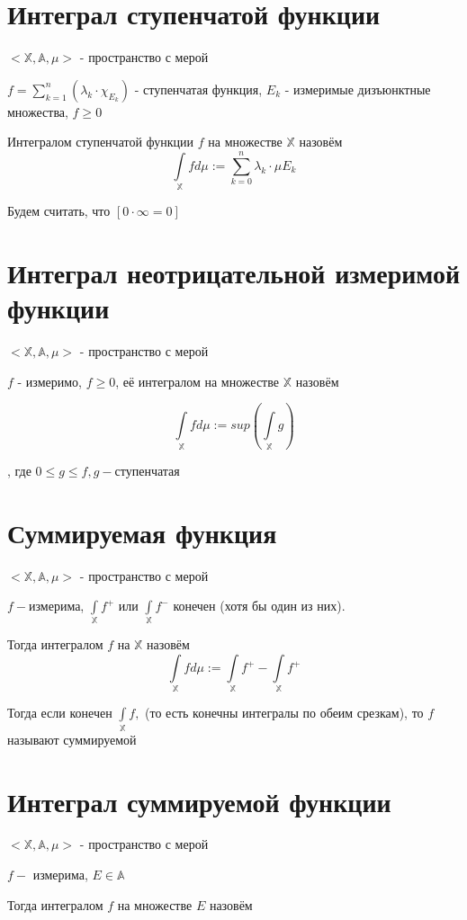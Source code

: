 \documentclass[paper=a4, fontsize=17pt]{article}
\begin{document}
	\section{Интеграл ступенчатой функции}
	$<\mathds{X}, \mathds{A}, \mu>$ - пространство с мерой
	
	$f = \sum\limits_{k = 1}^{n}(\lambda_k \cdot \chi_{E_k})$ - ступенчатая функция, $E_k$ - измеримые дизъюнктные множества, $f \geqslant 0$
	
	Интегралом ступенчатой функции $f$ на множестве $\mathds{X}$ назовём $$\int\limits_\mathds{X} f d\mu := \sum\limits_{k = 0}^{n} \lambda_k \cdot \mu E_k$$
	
	Будем считать, что $[0 \cdot \infty = 0]$
	
	\section{Интеграл неотрицательной измеримой функции}
	$<\mathds{X}, \mathds{A}, \mu>$ - пространство с мерой
	
	$f$ - измеримо, $f \geqslant 0$, её интегралом на множестве $\mathds{X}$ назовём
	
	$$\int\limits_{\mathds{X}} f d\mu := sup (\int\limits_{\mathds{X}} g)$$
	
	, где $0 \leqslant g \leqslant f, g - $ступенчатая
	
	\section{Суммируемая функция}
	$<\mathds{X}, \mathds{A}, \mu>$ - пространство с мерой
	
	$f - $измерима, $\int\limits_{\mathds{X}}f^+$ или $\int\limits_{\mathds{X}}f^-$ конечен (хотя бы один из них).
	
	Тогда интегралом $f$ на $\mathds{X}$ назовём $$\int\limits_{\mathds{X}}f d\mu := \int\limits_{\mathds{X}}f^+ - \int\limits_{\mathds{X}}f^+$$
	
	Тогда если конечен $\int\limits_{\mathds{X}} f,$ (то есть конечны интегралы по обеим срезкам), то $f$ называют суммируемой
	
	\section{Интеграл суммируемой функции}
	$<\mathds{X}, \mathds{A}, \mu>$ - пространство с мерой
	
	$f -$ измерима, $E \in \mathds{A}$
	
	Тогда интегралом $f$ на множестве $E$ назовём
	
\end{document}
